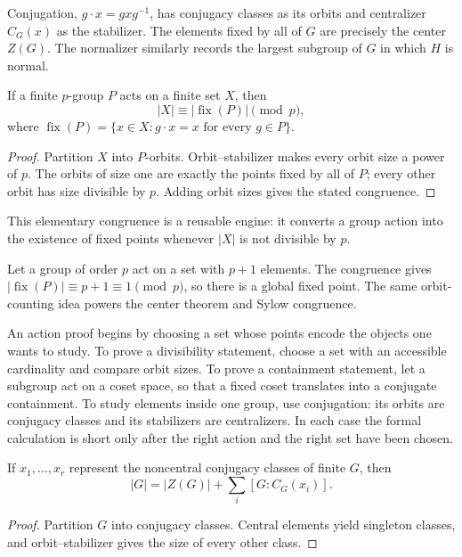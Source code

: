 Conjugation, \(g\cdot x=gxg^{-1}\), has conjugacy classes as its orbits and
centralizer \(C_G(x)\) as the stabilizer.  The elements fixed by all of \(G\)
are precisely the center \(Z(G)\).  The normalizer similarly records the
largest subgroup of \(G\) in which \(H\) is normal.

\begin{lemma}
If a finite \(p\)-group \(P\) acts on a finite set \(X\), then
\[|X|\equiv|\operatorname{fix}(P)|\pmod p,\]
where \(\operatorname{fix}(P)=\{x\in X:g\cdot x=x\text{ for every }g\in P\}\).
\end{lemma}
\begin{proof}
Partition \(X\) into \(P\)-orbits.  Orbit--stabilizer makes every orbit size
a power of \(p\).  The orbits of size one are exactly the points fixed by all
of \(P\); every other orbit has size divisible by \(p\).  Adding orbit sizes
gives the stated congruence.
\end{proof}

This elementary congruence is a reusable engine: it converts a group action
into the existence of fixed points whenever \(|X|\) is not divisible by \(p\).

\begin{example}
Let a group of order \(p\) act on a set with \(p+1\) elements.  The congruence
gives \(|\operatorname{fix}(P)|\equiv p+1\equiv1\pmod p\), so there is a global fixed point.
The same orbit-counting idea powers the center theorem and Sylow congruence.
\end{example}

\begin{remark}
An action proof begins by choosing a set whose points encode the objects one
wants to study.  To prove a divisibility statement, choose a set with an
accessible cardinality and compare orbit sizes.  To prove a containment
statement, let a subgroup act on a coset space, so that a fixed coset translates
into a conjugate containment.  To study elements inside one group, use
conjugation: its orbits are conjugacy classes and its stabilizers are
centralizers.  In each case the formal calculation is short only after the
right action and the right set have been chosen.
\end{remark}

\begin{theorem}
If \(x_1,\ldots,x_r\) represent the noncentral conjugacy classes of finite
\(G\), then
\[
|G|=|Z(G)|+\sum_i[G:C_G(x_i)].
\]
\end{theorem}
\begin{proof}
Partition \(G\) into conjugacy classes.  Central elements yield singleton
classes, and orbit--stabilizer gives the size of every other class.
\end{proof}

